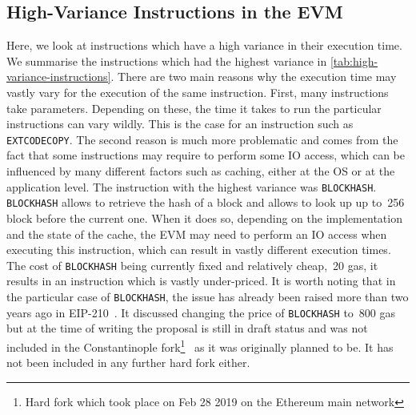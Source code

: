 \subsection{High-Variance Instructions in the EVM}
Here, we look at instructions which have a high variance in their execution time.
We summarise the instructions which had the highest variance in \autoref{tab:high-variance-instructions}.
There are two main reasons why the execution time may vastly vary for the execution of the same instruction.
First, many instructions take parameters.
Depending on these, the time it takes to run the particular instructions can vary wildly.
This is the case for an instruction such as \lstinline{EXTCODECOPY}.
The second reason is much more problematic and comes from the fact that some instructions may require to perform some IO access, which can be influenced by many different factors such as caching, either at the OS or at the application level.
The instruction with the highest variance was \lstinline{BLOCKHASH}.
\lstinline{BLOCKHASH} allows to retrieve the hash of a block and allows to look up up to~256 block before the current one.
When it does so, depending on the implementation and the state of the cache, the EVM may need to perform an IO access when executing this instruction, which can result in vastly different execution times.
The cost of \lstinline{BLOCKHASH} being currently fixed and relatively cheap,~20 gas, it results in an instruction which is vastly under-priced. It is worth noting that in the particular case of \lstinline{BLOCKHASH}, the issue has already been raised more than two years ago in EIP-210~\cite{eip-blockhash}.
It discussed changing the price of \lstinline{BLOCKHASH} to~800 gas but at the time of writing the proposal is still in draft status and was not included in the Constantinople fork\footnote{Hard fork which took place on Feb 28 2019 on the Ethereum main network}~\cite{constantinople} as it was originally planned to be.
It has not been included in any further hard fork either.

